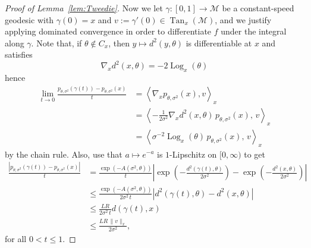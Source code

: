 \documentclass[preprint]{imsart}
\theoremstyle{plain}
\theoremstyle{definition}
\newcommand{\Mcal}{\mathcal{M}}
\DeclareMathOperator{\Tan}{Tan}
\DeclareMathOperator{\Log}{Log}
\begin{document}
\begin{appendix}
\begin{proof}[Proof of Lemma~\ref{lem:Tweedie}]
    Now we let $\gamma:[0,1]\to\Mcal$ be a constant-speed geodesic with $\gamma(0)=x$ and $v:=\gamma'(0)\in\Tan_x(\Mcal)$, and we justify applying dominated convergence in order to differentiate $f$ under the integral along $\gamma$.
    Note that, if $\theta\notin C_x$, then $y\mapsto d^2(y,\theta)$ is differentiable at $x$ and satisfies
    \[
        \nabla_x d^2(x,\theta) = -2\Log_x(\theta)
    \]
    hence
    \begin{align*}
        \lim_{t\to 0}\frac{p_{\theta,\sigma^2}(\gamma(t))-p_{\theta,\sigma^2}(x)}{t}
        &= \left\langle \nabla_x p_{\theta,\sigma^2}(x),v\right\rangle_x \\
        &= \left\langle
            -\frac{1}{2\sigma^2}\nabla_x d^2(x,\theta)\,
            p_{\theta,\sigma^2}(x),\,v
        \right\rangle_x \\
        &= \left\langle
            \sigma^{-2}\Log_x(\theta)\,p_{\theta,\sigma^2}(x),\,v
        \right\rangle_x
    \end{align*}
    by the chain rule.
    Also, use that $a\mapsto e^{-a}$ is $1$-Lipschitz on $[0,\infty)$ to get
    \begin{equation}\label{eqn:ptheat-diff-quotient}
        \begin{split}
            \frac{\left|p_{\theta,\sigma^2}(\gamma(t))-p_{\theta,\sigma^2}(x)\right|}{t}
        &= \frac{\exp(-A(\sigma^2,\theta))}{t}
        \left|
            \exp\left(-\frac{d^2(\gamma(t),\theta)}{2\sigma^2}\right)
            -
            \exp\left(-\frac{d^2(x,\theta)}{2\sigma^2}\right)
        \right| \\
        &\le \frac{\exp(-A(\sigma^2,\theta))}{2\sigma^2\,t}
        \left|d^2(\gamma(t),\theta)-d^2(x,\theta)\right| \\
        &\le \frac{LR}{2\sigma^2\,t}d(\gamma(t),x) \\
        &\le \frac{LR\,\|v\|_x}{2\sigma^2},
        \end{split}
    \end{equation}
    for all $0< t\le 1$.


\end{proof}
\end{appendix}
\end{document}

